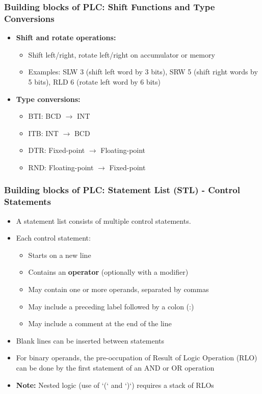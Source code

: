 \begin{frame}
	\frametitle{Building blocks of PLC: Shift Functions and Type Conversions}
	\footnotesize
	\begin{itemize}
		\item \textbf{Shift and rotate operations:}
		\begin{itemize}
			\item Shift left/right, rotate left/right on accumulator or memory
			\item Examples: SLW 3 (shift left word by 3 bits), SRW 5 (shift right words by 5 bits), RLD 6 (rotate left word by 6 bits)
		\end{itemize}
		\item \textbf{Type conversions:}
		\begin{itemize}
			\item BTI: BCD $\rightarrow$ INT
			\item ITB: INT $\rightarrow$ BCD
			\item DTR: Fixed-point $\rightarrow$ Floating-point
			\item RND: Floating-point $\rightarrow$ Fixed-point
		\end{itemize}
	\end{itemize}
\end{frame}

\begin{frame}
	\frametitle{Building blocks of PLC: Statement List (STL) - Control Statements}
	\footnotesize
	\begin{itemize}
		\item A statement list consists of multiple control statements.
		\item Each control statement:
		\begin{itemize}
			\item Starts on a new line
			\item Contains an \textbf{operator} (optionally with a modifier)
			\item May contain one or more operands, separated by commas
			\item May include a preceding label followed by a colon (:)
			\item May include a comment at the end of the line
		\end{itemize}
		\item Blank lines can be inserted between statements
		\item For binary operands, the pre-occupation of Result of Logic Operation (RLO) can be done by the first statement of an AND or OR operation
		\item \textbf{Note:} Nested logic (use of `(` and `)`) requires a stack of RLOs
	\end{itemize}
\end{frame}


